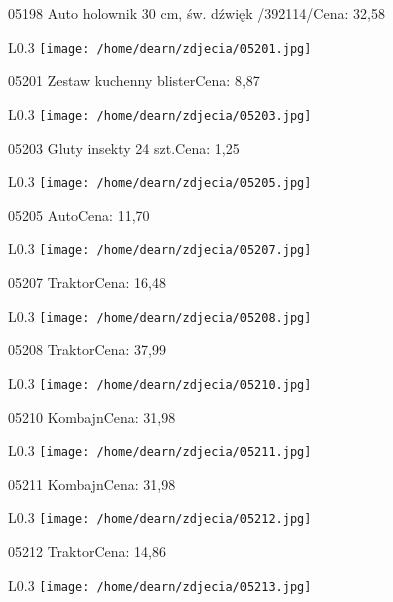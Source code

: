 05198 Auto holownik 30 cm, św. dźwięk /392114/Cena: 32,58\newline
\begin{wrapfigure}{L}{0.3\textwidth}
\texttt{[image: /home/dearn/zdjecia/05201.jpg]}
\end{wrapfigure}
05201 Zestaw kuchenny blisterCena: 8,87\newline
\begin{wrapfigure}{L}{0.3\textwidth}
\texttt{[image: /home/dearn/zdjecia/05203.jpg]}
\end{wrapfigure}
05203 Gluty insekty 24 szt.Cena: 1,25\newline
\begin{wrapfigure}{L}{0.3\textwidth}
\texttt{[image: /home/dearn/zdjecia/05205.jpg]}
\end{wrapfigure}
05205 AutoCena: 11,70\newline
\begin{wrapfigure}{L}{0.3\textwidth}
\texttt{[image: /home/dearn/zdjecia/05207.jpg]}
\end{wrapfigure}
05207 TraktorCena: 16,48\newline
\begin{wrapfigure}{L}{0.3\textwidth}
\texttt{[image: /home/dearn/zdjecia/05208.jpg]}
\end{wrapfigure}
05208 TraktorCena: 37,99\newline
\begin{wrapfigure}{L}{0.3\textwidth}
\texttt{[image: /home/dearn/zdjecia/05210.jpg]}
\end{wrapfigure}
05210 KombajnCena: 31,98\newline
\begin{wrapfigure}{L}{0.3\textwidth}
\texttt{[image: /home/dearn/zdjecia/05211.jpg]}
\end{wrapfigure}
05211 KombajnCena: 31,98\newline
\begin{wrapfigure}{L}{0.3\textwidth}
\texttt{[image: /home/dearn/zdjecia/05212.jpg]}
\end{wrapfigure}
05212 TraktorCena: 14,86\newline
\begin{wrapfigure}{L}{0.3\textwidth}
\texttt{[image: /home/dearn/zdjecia/05213.jpg]}
\end{wrapfigure}
